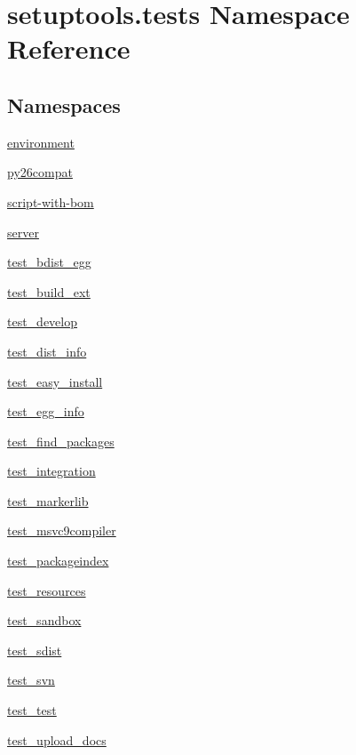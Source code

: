 \hypertarget{namespacesetuptools_1_1tests}{}\section{setuptools.\+tests Namespace Reference}
\label{namespacesetuptools_1_1tests}
\subsection*{Namespaces}
\begin{DoxyCompactItemize}
\item 
 \hyperlink{namespacesetuptools_1_1tests_1_1environment}{environment}
\item 
 \hyperlink{namespacesetuptools_1_1tests_1_1py26compat}{py26compat}
\item 
 \hyperlink{namespacesetuptools_1_1tests_1_1script-with-bom}{script-\/with-\/bom}
\item 
 \hyperlink{namespacesetuptools_1_1tests_1_1server}{server}
\item 
 \hyperlink{namespacesetuptools_1_1tests_1_1test__bdist__egg}{test\+\_\+bdist\+\_\+egg}
\item 
 \hyperlink{namespacesetuptools_1_1tests_1_1test__build__ext}{test\+\_\+build\+\_\+ext}
\item 
 \hyperlink{namespacesetuptools_1_1tests_1_1test__develop}{test\+\_\+develop}
\item 
 \hyperlink{namespacesetuptools_1_1tests_1_1test__dist__info}{test\+\_\+dist\+\_\+info}
\item 
 \hyperlink{namespacesetuptools_1_1tests_1_1test__easy__install}{test\+\_\+easy\+\_\+install}
\item 
 \hyperlink{namespacesetuptools_1_1tests_1_1test__egg__info}{test\+\_\+egg\+\_\+info}
\item 
 \hyperlink{namespacesetuptools_1_1tests_1_1test__find__packages}{test\+\_\+find\+\_\+packages}
\item 
 \hyperlink{namespacesetuptools_1_1tests_1_1test__integration}{test\+\_\+integration}
\item 
 \hyperlink{namespacesetuptools_1_1tests_1_1test__markerlib}{test\+\_\+markerlib}
\item 
 \hyperlink{namespacesetuptools_1_1tests_1_1test__msvc9compiler}{test\+\_\+msvc9compiler}
\item 
 \hyperlink{namespacesetuptools_1_1tests_1_1test__packageindex}{test\+\_\+packageindex}
\item 
 \hyperlink{namespacesetuptools_1_1tests_1_1test__resources}{test\+\_\+resources}
\item 
 \hyperlink{namespacesetuptools_1_1tests_1_1test__sandbox}{test\+\_\+sandbox}
\item 
 \hyperlink{namespacesetuptools_1_1tests_1_1test__sdist}{test\+\_\+sdist}
\item 
 \hyperlink{namespacesetuptools_1_1tests_1_1test__svn}{test\+\_\+svn}
\item 
 \hyperlink{namespacesetuptools_1_1tests_1_1test__test}{test\+\_\+test}
\item 
 \hyperlink{namespacesetuptools_1_1tests_1_1test__upload__docs}{test\+\_\+upload\+\_\+docs}
\end{DoxyCompactItemize}
